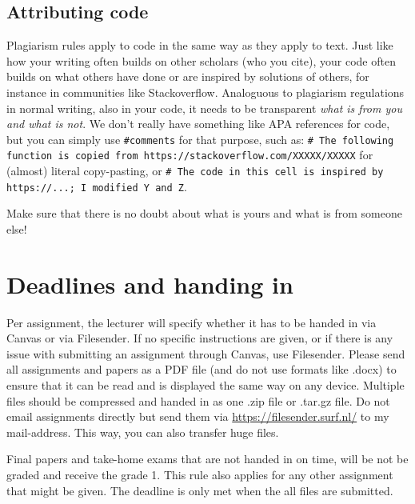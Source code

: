 \documentclass[a4paper,10pt,twocolumn]{report}
\begin{document}
\subsection{Attributing code}
Plagiarism rules apply to code in the same way as they apply to text. Just like how your writing often builds on other scholars (who you cite), your code often builds on what others have done or are inspired by solutions of others, for instance in communities like Stackoverflow. Analoguous to plagiarism regulations in normal writing, also in your code, it needs to be transparent \emph{what is from you and what is not}. We don't really have something like APA references for code, but you can simply use \texttt{\#comments} for that purpose, such as:
\texttt{\# The following function is copied from https://stackoverflow.com/XXXXX/XXXXX} for (almost) literal copy-pasting, or \texttt{\# The code in this cell is inspired by https://...; I modified Y and Z}. 

Make sure that there is no doubt about what is yours and what is from someone else!

\section{Deadlines and handing in}
Per assignment, the lecturer will specify whether it has to be handed in via Canvas or via Filesender. If no specific instructions are given, or if there is any issue with submitting an assignment through Canvas, use Filesender. Please send all assignments and papers as a PDF file (and do not use formats like .docx) to ensure that it can be read and is displayed the same way on any device. Multiple files should be compressed and handed in as one .zip file or .tar.gz file. Do not email assignments directly but send them via \url{https://filesender.surf.nl/} to my mail-address. This way, you can also transfer huge files.

Final papers and take-home exams that are not handed in on time, will be not be graded and receive the grade 1. This rule also applies for any other assignment that might be given. The deadline is only met when the all files are submitted.
\end{document}
